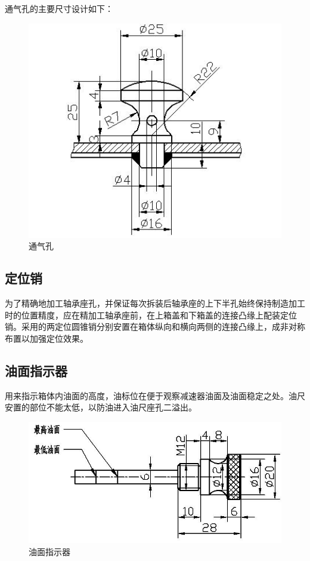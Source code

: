 通气孔的主要尺寸设计如下：
\begin{figure}[h]
    \centering
    \includegraphics[scale=0.45]{graphic/10-2.jpg}
    \caption{通气孔}
\end{figure}
\subsection{定位销}
为了精确地加工轴承座孔，并保证每次拆装后轴承座的上下半孔始终保持制造加工时的位置精度，应在精加工轴承座前，在上箱盖和下箱盖的连接凸缘上配装定位销。采用的两定位圆锥销分别安置在箱体纵向和横向两侧的连接凸缘上，成非对称布置以加强定位效果。
\subsection{油面指示器}
用来指示箱体内油面的高度，油标位在便于观察减速器油面及油面稳定之处。油尺安置的部位不能太低，以防油进入油尺座孔二溢出。
\begin{figure}[h]
    \centering
    \includegraphics[scale=0.45]{graphic/10-5.jpg}
    \caption{油面指示器}
\end{figure}

